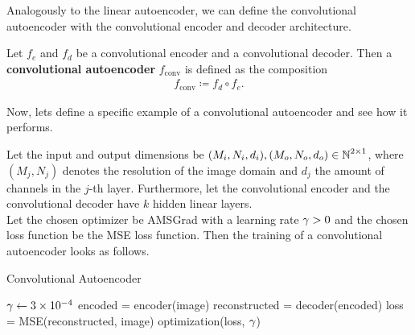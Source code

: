 Analogously to the linear autoencoder, we can define the convolutional autoencoder with the convolutional encoder and decoder architecture.

\begin{definition}
Let $f_e$ and $f_d$ be a convolutional encoder and a convolutional decoder. Then a \textbf{convolutional autoencoder} $f_{\text{conv}}$ is defined as the composition
\begin{align*}
f_{\text{conv}} \coloneqq f_d \circ f_e.
\end{align*}
\end{definition}

Now, lets define a specific example of a convolutional autoencoder and see how it performs.

\begin{algorithm}
Let the input and output dimensions be $(M_i,N_i, d_i), (M_o,N_o,d_o) \in \operatorname{\mathbb{N}}^{2\times 1}$, where $(M_j, N_j)$ denotes the resolution of the image domain and $d_j$ the amount of channels in the $j$-th layer. Furthermore, let the convolutional encoder and the convolutional decoder have $k$ hidden linear layers.\\
Let the chosen optimizer be AMSGrad with a learning rate $\operatorname{\gamma}>0$ and the chosen loss function be the MSE loss function. Then the training of a convolutional autoencoder looks as follows.
\caption{Convolutional Autoencoder}\label{alg:convolutional_AE}
\begin{algorithmic}[1]
\Require $\operatorname{\gamma} \gets \num{3e-4}$
	    \State encoded = encoder(image) 
		\State reconstructed = decoder(encoded) 
    	\State loss = MSE(reconstructed, image) 
	    \State optimization(loss, $\operatorname{\gamma}$) 
    \EndFor
\EndFor
\end{algorithmic}
\end{algorithm}

